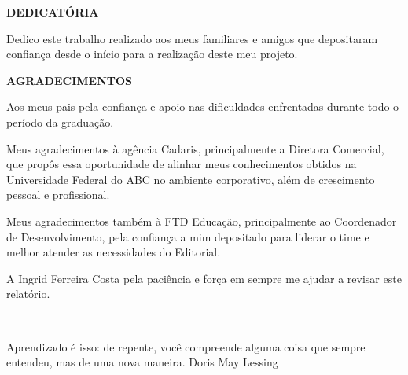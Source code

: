 \documentclass[
  12pt,				%
  openany,
  oneside,
  a4paper,			%
  english,			%
  brazil
]{article}
\numberwithin{figure}{section}
\numberwithin{table}{section}
\begin{document}

\begin{titlepage}

\begin{center}
\textbf{DEDICATÓRIA}
\end{center}

Dedico este trabalho realizado aos meus familiares e amigos que depositaram confiança desde o início para a realização deste meu projeto.

\end{titlepage}


\begin{titlepage}

\begin{center}
\textbf{AGRADECIMENTOS}
\end{center}

Aos meus pais pela confiança e apoio nas dificuldades enfrentadas durante todo o período da graduação.

Meus agradecimentos à agência Cadaris, principalmente a Diretora Comercial, que propôs essa oportunidade de alinhar meus conhecimentos obtidos na Universidade Federal do ABC no ambiente corporativo, além de crescimento pessoal e profissional.

Meus agradecimentos também à FTD Educação, principalmente ao Coordenador de Desenvolvimento, pela confiança a mim depositado para liderar o time e melhor atender as necessidades do Editorial.

A Ingrid Ferreira Costa pela paciência e força em sempre me ajudar a revisar este relatório.

\end{titlepage}


\begin{titlepage}
~\\\vspace{18cm}
\begin{raggedleft}

\begin{epigraph}
  {Aprendizado é isso: de repente, você compreende alguma coisa que sempre entendeu, mas de uma nova maneira.}
  {Doris May Lessing}
\end{epigraph}

\end{raggedleft}

\end{titlepage}
\end{document}
